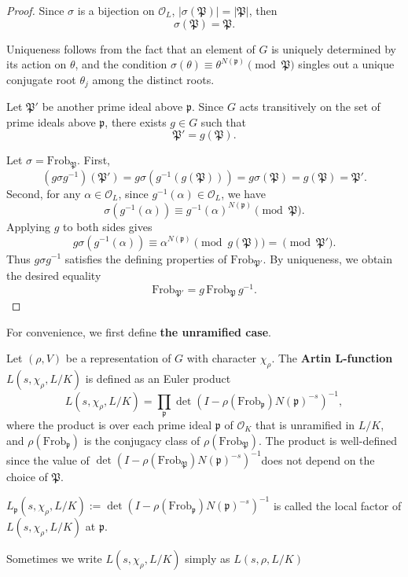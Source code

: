 \begin{proof}
Since \(\sigma\) is a bijection on \(\mathcal{O}_L\), $|\sigma(\mathfrak{P})| = |\mathfrak{P}|$, then
\[
\sigma(\mathfrak{P}) = \mathfrak{P}.
\]


Uniqueness follows from the fact that an element of \(G\) is uniquely determined by its action on \(\theta\), and the condition \(\sigma(\theta) \equiv \theta^{N(\mathfrak{p})} \pmod{\mathfrak{P}}\) singles out a unique conjugate root \(\theta_j\) among the distinct roots.


Let \(\mathfrak{P}'\) be another prime ideal above \(\mathfrak{p}\). Since \(G\) acts transitively on the set of prime ideals above \(\mathfrak{p}\), there exists \(g \in G\) such that
\[
\mathfrak{P}' = g(\mathfrak{P}).
\]

Let \(\sigma = \mathrm{Frob}_{\mathfrak{P}}\). First,
\[
(g\sigma g^{-1})(\mathfrak{P}') = g\sigma(g^{-1}(g(\mathfrak{P}))) = g\sigma(\mathfrak{P}) = g(\mathfrak{P}) = \mathfrak{P}'.
\]
Second, for any \(\alpha \in \mathcal{O}_L\), since \(g^{-1}(\alpha) \in \mathcal{O}_L\), we have
\[
\sigma(g^{-1}(\alpha)) \equiv g^{-1}(\alpha)^{N(\mathfrak{p})} \pmod{\mathfrak{P}}.
\]
Applying \(g\) to both sides gives
\[
g\sigma(g^{-1}(\alpha)) \equiv \alpha^{N(\mathfrak{p})} \pmod{g(\mathfrak{P})} = \pmod{\mathfrak{P}'}.
\]
Thus \(g\sigma g^{-1}\) satisfies the defining properties of \(\mathrm{Frob}_{\mathfrak{P}'}\). By uniqueness, we obtain the desired equality\[
\mathrm{Frob}_{\mathfrak{P}'} = g \,\mathrm{Frob}_{\mathfrak{P}}\, g^{-1}.
\]
\end{proof}

For convenience, we first define\textbf{ the  unramified case}.

\begin{defn}
Let \((\rho,V)\) be a representation of \(G\) with character \(\chi_\rho\). The \textbf{Artin L-function} \(L(s, \chi_\rho, L/K)\) is defined as an Euler product
\[
L(s, \chi_\rho, L/K) = \prod_{\mathfrak{p}} \det \left( I - \rho(\mathrm{Frob}_{\mathfrak{p}}) N(\mathfrak{p})^{-s} \right)^{-1},
\]
where the product is over each prime ideal \(\mathfrak{p}\) of \(\mathcal{O}_K\) that is unramified in \(L/K\), and $\rho(\mathrm{Frob}_{\mathfrak{p}})$ is the conjugacy class of  \(\rho(\mathrm{Frob}_{\mathfrak{P}})\). The product is well-defined since the value of $\det \left( I - \rho(\mathrm{Frob}_{\mathfrak{P}}) N(\mathfrak{p})^{-s} \right)^{-1}$does not depend on the choice of $\mathfrak{P}$.

$L_{\mathfrak{p}}(s, \chi_\rho, L/K):= \det \left( I - \rho(\mathrm{Frob}_{\mathfrak{p}}) N(\mathfrak{p})^{-s} \right)^{-1}$ is called the local factor of \(L(s, \chi_\rho, L/K)\) at \(\mathfrak{p}\).

Sometimes we write $L(s, \chi_\rho, L/K)$ simply as $L(s, \rho, L/K)$
\end{defn}

